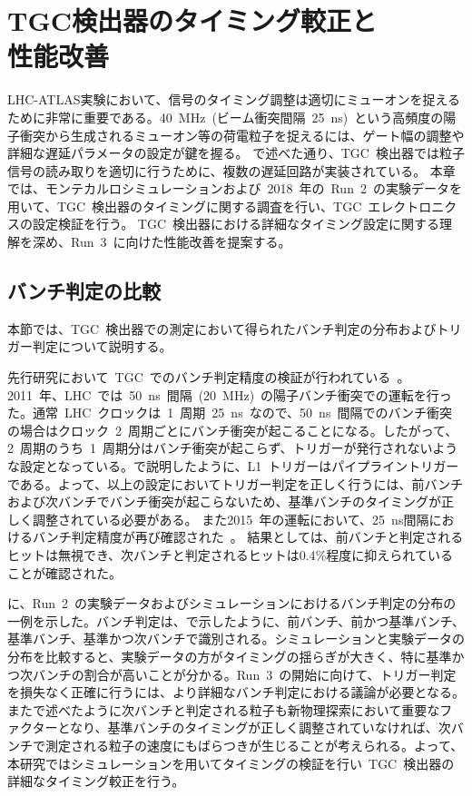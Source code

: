 \chapter[TGC検出器のタイミング較正と性能改善]{TGC検出器のタイミング較正と\\性能改善}
\thispagestyle{empty}
\label{chap:5}
LHC-ATLAS実験において、信号のタイミング調整は適切にミューオンを捉えるために非常に重要である。40~MHz~(ビーム衝突間隔~25~ns)~という高頻度の陽子衝突から生成されるミューオン等の荷電粒子を捉えるには、ゲート幅の調整や詳細な遅延パラメータの設定が鍵を握る。
で述べた通り、TGC~検出器では粒子信号の読み取りを適切に行うために、複数の遅延回路が実装されている。
本章では、モンテカルロシミュレーションおよび~2018~年の~Run~2~の実験データを用いて、TGC~検出器のタイミングに関する調査を行い、TGC~エレクトロニクスの設定検証を行う。
TGC~検出器における詳細なタイミング設定に関する理解を深め、Run~3~に向けた性能改善を提案する。

\section{バンチ判定の比較}
本節では、TGC~検出器での測定において得られたバンチ判定の分布およびトリガー判定について説明する。

先行研究において~TGC~でのバンチ判定精度の検証が行われている~\cite{MT:05}。2011~年、LHC~では~50~ns~間隔~(20~MHz)~の陽子バンチ衝突での運転を行った。通常~LHC~クロックは~1~周期~25~ns~なので、50~ns~間隔でのバンチ衝突の場合はクロック~2~周期ごとにバンチ衝突が起こることになる。したがって、2~周期のうち~1~周期分はバンチ衝突が起こらず、トリガーが発行されないような設定となっている。で説明したように、L1~トリガーはパイプライントリガーである。よって、以上の設定においてトリガー判定を正しく行うには、前バンチおよび次バンチでバンチ衝突が起こらないため、基準バンチのタイミングが正しく調整されている必要がある。
また2015~年の運転において、25~ns間隔におけるバンチ判定精度が再び確認された~\cite{kishimoto}。
結果としては、前バンチと判定されるヒットは無視でき、次バンチと判定されるヒットは0.4$\%$程度に抑えられていることが確認された。

に、Run~2~の実験データおよびシミュレーションにおけるバンチ判定の分布の一例を示した。バンチ判定は、で示したように、前バンチ、前かつ基準バンチ、基準バンチ、基準かつ次バンチで識別される。シミュレーションと実験データの分布を比較すると、実験データの方がタイミングの揺らぎが大きく、特に基準かつ次バンチの割合が高いことが分かる。Run~3~の開始に向けて、トリガー判定を損失なく正確に行うには、より詳細なバンチ判定における議論が必要となる。またで述べたように次バンチと判定される粒子も新物理探索において重要なファクターとなり、基準バンチのタイミングが正しく調整されていなければ、次バンチで測定される粒子の速度にもばらつきが生じることが考えられる。よって、本研究ではシミュレーションを用いてタイミングの検証を行い~TGC~検出器の詳細なタイミング較正を行う。

